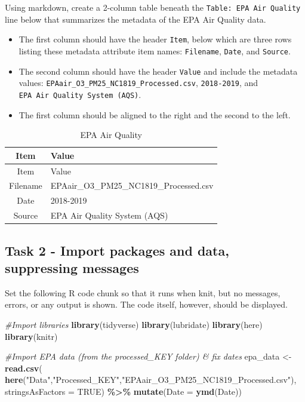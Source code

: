 \documentclass[
]{article}
\newenvironment{Shaded}{\begin{snugshade}}{\end{snugshade}}
\newcommand{\AttributeTok}[1]{\textcolor[rgb]{0.13,0.29,0.53}{#1}}
\newcommand{\CommentTok}[1]{\textcolor[rgb]{0.56,0.35,0.01}{\textit{#1}}}
\newcommand{\ConstantTok}[1]{\textcolor[rgb]{0.56,0.35,0.01}{#1}}
\newcommand{\FunctionTok}[1]{\textcolor[rgb]{0.13,0.29,0.53}{\textbf{#1}}}
\newcommand{\NormalTok}[1]{#1}
\newcommand{\OtherTok}[1]{\textcolor[rgb]{0.56,0.35,0.01}{#1}}
\newcommand{\SpecialCharTok}[1]{\textcolor[rgb]{0.81,0.36,0.00}{\textbf{#1}}}
\newcommand{\StringTok}[1]{\textcolor[rgb]{0.31,0.60,0.02}{#1}}
\begin{document}
Using markdown, create a 2-column table beneath the
\texttt{Table:\ EPA\ Air\ Quality} line below that summarizes the
metadata of the EPA Air Quality data.

\begin{itemize}
\item
  The first column should have the header \texttt{Item}, below which are
  three rows listing these metadata attribute item names:
  \texttt{Filename}, \texttt{Date}, and \texttt{Source}.
\item
  The second column should have the header \texttt{Value} and include
  the metadata values: \texttt{EPAair\_O3\_PM25\_NC1819\_Processed.csv},
  \texttt{2018-2019}, and \texttt{EPA\ Air\ Quality\ System\ (AQS)}.
\item
  The first column should be aligned to the right and the second to the
  left.
\end{itemize}

\begin{longtable}[]{@{}cl@{}}
\caption{EPA Air Quality}\tabularnewline
\toprule\noalign{}
Item & Value \\
\midrule\noalign{}
\endfirsthead
\toprule\noalign{}
Item & Value \\
\midrule\noalign{}
\endhead
\bottomrule\noalign{}
\endlastfoot
Filename & EPAair\_O3\_PM25\_NC1819\_Processed.csv \\
Date & 2018-2019 \\
Source & EPA Air Quality System (AQS) \\
\end{longtable}

\subsection{Task 2 - Import packages and data, suppressing
messages}\label{task-2---import-packages-and-data-suppressing-messages}

Set the following R code chunk so that it runs when knit, but no
messages, errors, or any output is shown. The code itself, however,
should be displayed.

\begin{Shaded}
\begin{Highlighting}[]
\CommentTok{\#Import libraries}
\FunctionTok{library}\NormalTok{(tidyverse)}
\FunctionTok{library}\NormalTok{(lubridate)}
\FunctionTok{library}\NormalTok{(here)}
\FunctionTok{library}\NormalTok{(knitr)}

\CommentTok{\#Import EPA data (from the processed\_KEY folder) \& fix dates}
\NormalTok{epa\_data }\OtherTok{\textless{}{-}} \FunctionTok{read.csv}\NormalTok{(}
  \FunctionTok{here}\NormalTok{(}\StringTok{"Data"}\NormalTok{,}\StringTok{"Processed\_KEY"}\NormalTok{,}\StringTok{"EPAair\_O3\_PM25\_NC1819\_Processed.csv"}\NormalTok{),}
  \AttributeTok{stringsAsFactors =} \ConstantTok{TRUE}\NormalTok{) }\SpecialCharTok{\%\textgreater{}\%} 
  \FunctionTok{mutate}\NormalTok{(}\AttributeTok{Date =} \FunctionTok{ymd}\NormalTok{(Date))}
\end{Highlighting}
\end{Shaded}
\end{document}
